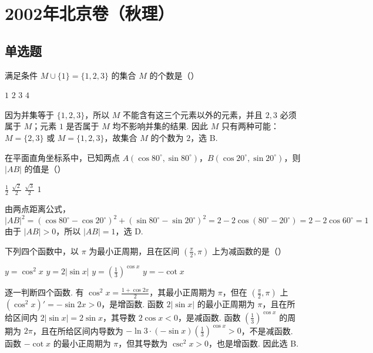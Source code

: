 \chapter{2002年北京卷（秋理）}
\section{单选题}
\begin{problem}
满足条件 \(M \cup \{1\} = \{1,2,3\}\) 的集合 \(M\) 的个数是（\quad）

\choices
    {\(1\)}
    {\(2\)}
    {\(3\)}
    {\(4\)}

\begin{solution}
因为并集等于 \(\{1,2,3\}\)，所以 \(M\) 不能含有这三个元素以外的元素，并且 \(2,3\) 必须属于 \(M\)；元素 \(1\) 是否属于 \(M\) 均不影响并集的结果. 因此 \(M\) 只有两种可能：\(M=\{2,3\}\) 或 \(M=\{1,2,3\}\)，故集合 \(M\) 的个数为 \(2\)，选 B.
\end{solution}
\end{problem}

\begin{problem}
在平面直角坐标系中，已知两点 \(A(\cos 80^{\circ},\sin 80^{\circ})\)，\(B(\cos 20^{\circ},\sin 20^{\circ})\)，则 \(|AB|\) 的值是（\quad）

\choices
    {\(\frac{1}{2}\)}
    {\(\frac{\sqrt{2}}{2}\)}
    {\(\frac{\sqrt{3}}{2}\)}
    {\(1\)}

\begin{solution}
由两点距离公式，
\[
|AB|^{2}=(\cos80^{\circ}-\cos20^{\circ})^{2}+(\sin80^{\circ}-\sin20^{\circ})^{2}=2-2\cos(80^{\circ}-20^{\circ})=2-2\cos60^{\circ}=1
\]
由于 \(|AB|>0\)，所以 \(|AB|=1\)，选 D.
\end{solution}
\end{problem}

\begin{problem}
下列四个函数中，以 \(\pi\) 为最小正周期，且在区间 \(\left(\frac{\pi}{2},\pi\right)\) 上为减函数的是（\quad）

\choices
    {\(y=\cos^{2}x\)}
    {\(y=2|\sin x|\)}
    {\(y=\left(\frac{1}{3}\right)^{\cos x}\)}
    {\(y=-\cot x\)}

\begin{solution}
逐一判断四个函数. 有 \(\cos^{2}x=\frac{1+\cos2x}{2}\)，其最小正周期为 \(\pi\)，但在 \(\left(\frac{\pi}{2},\pi\right)\) 上 \((\cos^{2}x)'=-\sin2x>0\)，是增函数. 函数 \(2|\sin x|\) 的最小正周期为 \(\pi\)，且在所给区间内 \(2|\sin x|=2\sin x\)，其导数 \(2\cos x<0\)，是减函数. 函数 \(\left(\frac13\right)^{\cos x}\) 的周期为 \(2\pi\)，且在所给区间内导数为 \(-\ln3\cdot(-\sin x)\left(\frac13\right)^{\cos x}>0\)，不是减函数. 函数 \(-\cot x\) 的最小正周期为 \(\pi\)，但其导数为 \(\csc^{2}x>0\)，也是增函数. 因此选 B.
\end{solution}
\end{problem}

